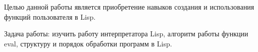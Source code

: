
Целью данной работы является приобретение навыков создания и использования функций пользователя в Lisp.

Задача работы: изучить работу интерпретатора Lisp, алгоритм работы функции eval, структуру и порядок обработки программ в Lisp.

\clearpage
